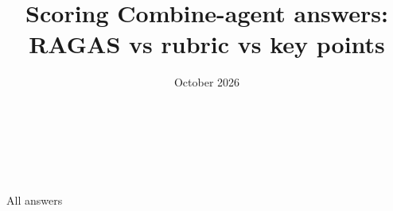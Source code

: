 
\title[Nugget scoring for the Combine agent evals]{Scoring Combine-agent answers:\\RAGAS vs rubric vs key points}
\date[October 2026]{October 2026}


\begin{frame}[plain]
  \vspace{2em}
  \begin{center}
    {\color{cmsblue}\Large\bfseries\inserttitle}\\[2.2em]
    {\large\insertauthor}\\[1em]
    {\small\insertinstitute}\\[2.2em]
    {\small\color{cmsgrey}\insertdate}
  \end{center}
\end{frame}



\begin{frame}[plain]
  \centering\vfill{\color{cmsblue}\Huge All answers}\vfill
\end{frame}


